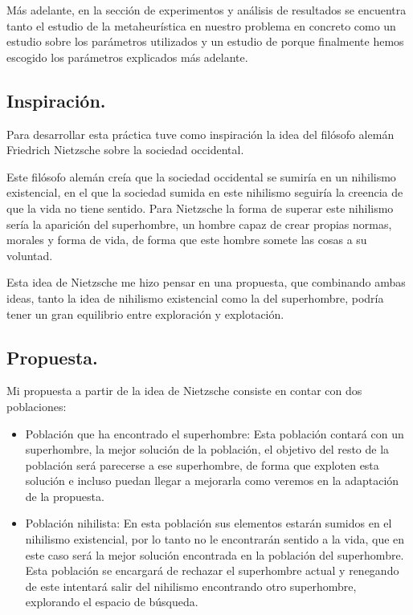 \documentclass[12pt, spanish]{article}
\begin{document}
Más adelante, en la sección de experimentos y análisis de resultados se encuentra tanto el estudio de la metaheurística en nuestro problema en concreto como un estudio sobre los parámetros utilizados y un estudio de porque finalmente hemos escogido los parámetros explicados más adelante.

\subsection{Inspiración.}

Para desarrollar esta práctica tuve como inspiración la idea del filósofo alemán Friedrich Nietzsche sobre la sociedad occidental.

Este filósofo alemán creía que la sociedad occidental se sumiría en un nihilismo existencial, en el que la sociedad sumida en este nihilismo seguiría la creencia de que la vida no tiene sentido. Para Nietzsche la forma de superar este nihilismo sería la aparición del superhombre, un hombre capaz de crear propias normas, morales y forma de vida, de forma que este hombre somete las cosas a su voluntad.

Esta idea de Nietzsche me hizo pensar en una propuesta, que combinando ambas ideas, tanto la idea de nihilismo existencial como la del superhombre, podría tener un gran equilibrio entre exploración y explotación.  

\subsection{Propuesta.}

Mi propuesta a partir de la idea de Nietzsche consiste en contar con dos poblaciones:

\begin{itemize}
	\item Población que ha encontrado el superhombre: Esta población contará con un superhombre, la mejor solución de la población, el objetivo del resto de la población será parecerse a ese superhombre, de forma que exploten esta solución e incluso puedan llegar a mejorarla como veremos en la adaptación de la propuesta.
	\item Población nihilista: En esta población sus elementos estarán sumidos en el nihilismo existencial, por lo tanto no le encontrarán sentido a la vida, que en este caso será la mejor solución encontrada en la población del superhombre. Esta población se encargará de rechazar el superhombre actual y renegando de este intentará salir del nihilismo encontrando otro superhombre, explorando el espacio de búsqueda.
\end{itemize}
\end{document}
